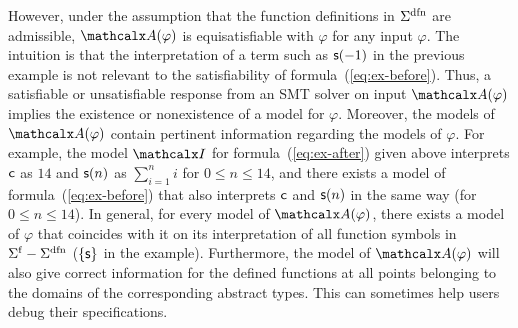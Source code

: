 However, under the assumption that the function definitions in
$\sfundefs{\Sigma}$ are admissible, %
$\conv(\varphi)$ is equisatisfiable with $\varphi$ for any input $\varphi$.
The intuition is that the
interpretation of a term such as $\mathsf{s}( -1 )$ in the previous example is not
relevant to the satisfiability of formula~(\ref{eq:ex-before}). Thus, a
satisfiable or unsatisfiable response from an SMT solver on input $\conv(
\varphi )$ implies the existence or nonexistence of a model for
$\varphi$. Moreover, the models of $\conv( \varphi )$ contain
pertinent information regarding the models of $\varphi$. For example, the model
$\I$ for formula~(\ref{eq:ex-after}) given above interprets $\mathsf{c}$ as $14$
and $\mathsf{s}(n)$ as $\sum_{i=1}^n i$ for $0 \le n \le 14$,
and there exists a model of formula~(\ref{eq:ex-before}) that also interprets
$\mathsf{c}$ and $\mathsf{s}(n)$ in the same way (for $0 \le n \le 14$).
In general, for every model of $\conv( \varphi )$,
there exists a model of $\varphi$ that
coincides with it on its interpretation of all
function symbols in $\sfuns{\Sigma} - \sfundefs{\Sigma}$ ($\{
\mathsf{s} \}$ in the example). Furthermore, the model of $\conv( \varphi )$ will
also give correct information for the defined functions at all points belonging
to the domains of the corresponding abstract types. This can sometimes help
users debug their specifications.



